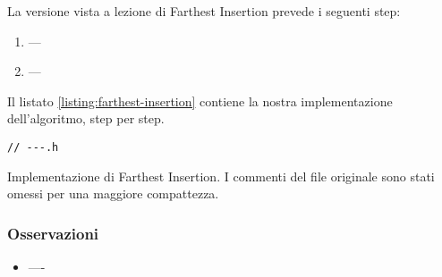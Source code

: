 La versione vista a lezione di Farthest Insertion prevede i seguenti step:

\begin{enumerate}
    \item ---
    \item ---
\end{enumerate}

\noindent Il listato \ref{listing:farthest-insertion} contiene la nostra implementazione dell'algoritmo, step per step.

\begin{listing}[!ht]
\begin{verbatim}
// ---.h

\end{verbatim}
\caption{Implementazione di Farthest Insertion. I commenti del file originale sono stati omessi per una maggiore compattezza.}
\label{listing:farthest-insertion}
\end{listing}

\subsubsection{Osservazioni}
\begin{itemize}
    \item ----\\

\end{itemize}
